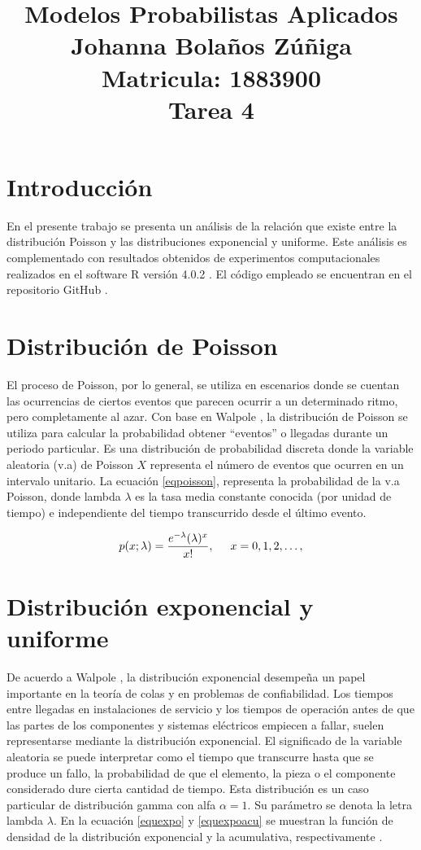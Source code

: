 \documentclass{article}
\title{
\centering
Modelos Probabilistas Aplicados \\
Johanna Bolaños Zúñiga \\
Matricula: 1883900\\
Tarea 4
}
\date{}
\begin{document}
\maketitle

\section{Introducción}
En el presente trabajo se presenta un análisis de la relación que existe entre la distribución Poisson y las distribuciones exponencial y uniforme. Este análisis es complementado con resultados obtenidos de experimentos computacionales realizados en el software R versión 4.0.2 \cite{r}. El código empleado se encuentran en el repositorio GitHub \cite{github}.

\section{Distribución de Poisson} \label{poisson}
El proceso de Poisson, por lo general, se utiliza en escenarios donde se cuentan las ocurrencias de ciertos eventos que parecen ocurrir a un determinado ritmo, pero completamente al azar. Con base en Walpole \cite{walpole}, la distribución de Poisson se utiliza para calcular la probabilidad obtener ``eventos” o llegadas durante un periodo particular. Es una distribución de probabilidad discreta donde la variable aleatoria (v.a) de Poisson $X$ representa el número de eventos que ocurren en un intervalo unitario. La ecuación \ref{eqpoisson}, representa la probabilidad de la v.a Poisson, donde lambda $\lambda$ es la tasa media constante conocida (por unidad de tiempo) e independiente del tiempo transcurrido desde el último evento.


\begin{equation} \label{eqpoisson}
p(x;\lambda)=\frac{e^{-\lambda}(\lambda)^x}{x!}, \hspace{0,5cm}x=0, 1, 2, \dots,
\end{equation}

\section{Distribución exponencial y uniforme} \label{expunif}

De acuerdo a Walpole \cite{walpole}, la distribución exponencial desempeña un papel importante en la teoría de colas y en problemas de confiabilidad. Los tiempos entre llegadas en instalaciones de servicio y los tiempos de operación antes de que las partes de los componentes y sistemas eléctricos empiecen a fallar, suelen representarse mediante la distribución exponencial. El significado de la variable aleatoria se puede interpretar como el tiempo que transcurre hasta que se produce un fallo, la probabilidad de que el elemento, la pieza o el componente considerado dure cierta cantidad de tiempo. Esta distribución es un caso particular de distribución gamma con alfa $\alpha = 1$. Su parámetro se denota la letra lambda $\lambda$. En la ecuación \ref{equexpo} y \ref{equexpoacu} se muestran la función de densidad de la distribución exponencial y la acumulativa, respectivamente \cite{notasElisa}.
\end{document}
